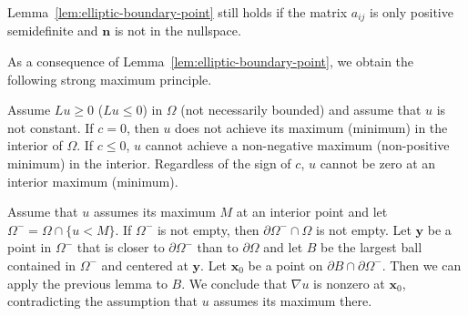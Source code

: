 \begin{Remark}
\label{rem:boundary-point-semidefinite}
Lemma~\ref{lem:elliptic-boundary-point} still holds if the matrix $a_{ij}$ is only positive semidefinite and $\bm{n}$ is not in the nullspace.
\end{Remark}

As a consequence of Lemma~\ref{lem:elliptic-boundary-point}, we obtain the following strong maximum principle.

\begin{Theorem}
\label{thm:strong-maximum-principle}
Assume $Lu\geq0$ ($Lu\leq0$) in $\Omega$ (not necessarily bounded) and assume that $u$ is not constant. If $c=0$, then $u$ does not achieve its maximum (minimum) in the interior of $\Omega$. If $c\leq0$, $u$ cannot achieve a non-negative maximum (non-positive minimum) in the interior. Regardless of the sign of $c$, $u$ cannot be zero at an interior maximum (minimum).
\end{Theorem}

\begin{Proof}
Assume that $u$ assumes its maximum $M$ at an interior point and let $\Omega^-=\Omega\cap\{u<M\}$. If $\Omega^-$ is not empty, then $\partial\Omega^-\cap\Omega$ is not empty. Let $\bm{y}$ be a point in $\Omega^-$ that is closer to $\partial\Omega^-$ than to $\partial\Omega$ and let $B$ be the largest ball contained in $\Omega^-$ and centered at $\bm{y}$. Let $\bm{x}_0$ be a point on $\partial B\cap\partial\Omega^-$. Then we can apply the previous lemma to $B$. We conclude that $\nabla u$ is nonzero at $\bm{x}_0$, contradicting the assumption that $u$ assumes its maximum there.
\end{Proof}
